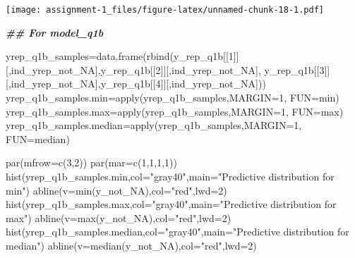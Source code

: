 \documentclass[
]{article}
\newenvironment{Shaded}{\begin{snugshade}}{\end{snugshade}}
\newcommand{\AttributeTok}[1]{\textcolor[rgb]{0.77,0.63,0.00}{#1}}
\newcommand{\DecValTok}[1]{\textcolor[rgb]{0.00,0.00,0.81}{#1}}
\newcommand{\DocumentationTok}[1]{\textcolor[rgb]{0.56,0.35,0.01}{\textbf{\textit{#1}}}}
\newcommand{\FunctionTok}[1]{\textcolor[rgb]{0.00,0.00,0.00}{#1}}
\newcommand{\NormalTok}[1]{#1}
\newcommand{\OtherTok}[1]{\textcolor[rgb]{0.56,0.35,0.01}{#1}}
\newcommand{\StringTok}[1]{\textcolor[rgb]{0.31,0.60,0.02}{#1}}
\begin{document}
\texttt{[image: assignment-1\_files/figure-latex/unnamed-chunk-18-1.pdf]}

\begin{Shaded}
\begin{Highlighting}[]
\DocumentationTok{\#\# For model\_q1b}


\NormalTok{yrep\_q1b\_samples}\OtherTok{=}\FunctionTok{data.frame}\NormalTok{(}\FunctionTok{rbind}\NormalTok{(y\_rep\_q1b[[}\DecValTok{1}\NormalTok{]][,ind\_yrep\_not\_NA],y\_rep\_q1b[[}\DecValTok{2}\NormalTok{]][,ind\_yrep\_not\_NA],}
\NormalTok{                              y\_rep\_q1b[[}\DecValTok{3}\NormalTok{]][,ind\_yrep\_not\_NA],y\_rep\_q1b[[}\DecValTok{4}\NormalTok{]][,ind\_yrep\_not\_NA]))}
\NormalTok{yrep\_q1b\_samples.min}\OtherTok{=}\FunctionTok{apply}\NormalTok{(yrep\_q1b\_samples,}\AttributeTok{MARGIN=}\DecValTok{1}\NormalTok{, }\AttributeTok{FUN=}\NormalTok{min)}
\NormalTok{yrep\_q1b\_samples.max}\OtherTok{=}\FunctionTok{apply}\NormalTok{(yrep\_q1b\_samples,}\AttributeTok{MARGIN=}\DecValTok{1}\NormalTok{, }\AttributeTok{FUN=}\NormalTok{max)}
\NormalTok{yrep\_q1b\_samples.median}\OtherTok{=}\FunctionTok{apply}\NormalTok{(yrep\_q1b\_samples,}\AttributeTok{MARGIN=}\DecValTok{1}\NormalTok{, }\AttributeTok{FUN=}\NormalTok{median)}

\FunctionTok{par}\NormalTok{(}\AttributeTok{mfrow=}\FunctionTok{c}\NormalTok{(}\DecValTok{3}\NormalTok{,}\DecValTok{2}\NormalTok{))}
\FunctionTok{par}\NormalTok{(}\AttributeTok{mar=}\FunctionTok{c}\NormalTok{(}\DecValTok{1}\NormalTok{,}\DecValTok{1}\NormalTok{,}\DecValTok{1}\NormalTok{,}\DecValTok{1}\NormalTok{))}
\FunctionTok{hist}\NormalTok{(yrep\_q1b\_samples.min,}\AttributeTok{col=}\StringTok{"gray40"}\NormalTok{,}\AttributeTok{main=}\StringTok{"Predictive distribution for min"}\NormalTok{)}
\FunctionTok{abline}\NormalTok{(}\AttributeTok{v=}\FunctionTok{min}\NormalTok{(y\_not\_NA),}\AttributeTok{col=}\StringTok{"red"}\NormalTok{,}\AttributeTok{lwd=}\DecValTok{2}\NormalTok{)}
\FunctionTok{hist}\NormalTok{(yrep\_q1b\_samples.max,}\AttributeTok{col=}\StringTok{"gray40"}\NormalTok{,}\AttributeTok{main=}\StringTok{"Predictive distribution for max"}\NormalTok{)}
\FunctionTok{abline}\NormalTok{(}\AttributeTok{v=}\FunctionTok{max}\NormalTok{(y\_not\_NA),}\AttributeTok{col=}\StringTok{"red"}\NormalTok{,}\AttributeTok{lwd=}\DecValTok{2}\NormalTok{)}
\FunctionTok{hist}\NormalTok{(yrep\_q1b\_samples.median,}\AttributeTok{col=}\StringTok{"gray40"}\NormalTok{,}\AttributeTok{main=}\StringTok{"Predictive distribution for median"}\NormalTok{)}
\FunctionTok{abline}\NormalTok{(}\AttributeTok{v=}\FunctionTok{median}\NormalTok{(y\_not\_NA),}\AttributeTok{col=}\StringTok{"red"}\NormalTok{,}\AttributeTok{lwd=}\DecValTok{2}\NormalTok{)}
\end{Highlighting}
\end{Shaded}
\end{document}
